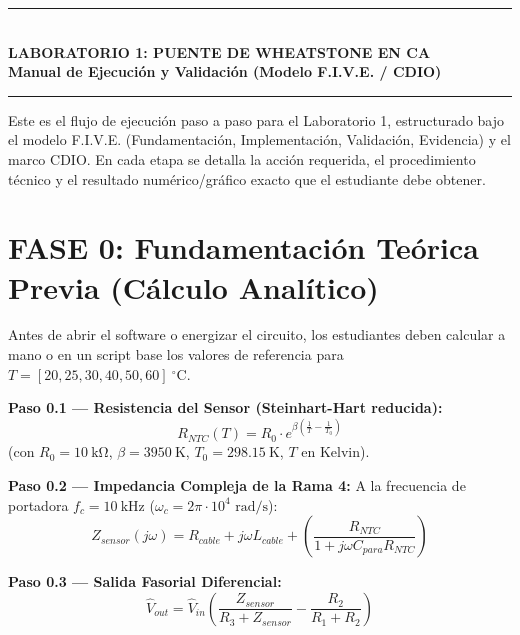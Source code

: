 \documentclass[11pt,a4paper]{article}
\begin{document}
\begin{center}
    \rule{\textwidth}{1pt}\\[0.3cm]
    {\Large \textbf{LABORATORIO 1: PUENTE DE WHEATSTONE EN CA}}\\[0.2cm]
    {\large \textbf{Manual de Ejecución y Validación (Modelo F.I.V.E. / CDIO)}}\\[0.2cm]
    \rule{\textwidth}{1pt}
\end{center}
\vspace{0.3cm}

Este es el flujo de ejecución paso a paso para el Laboratorio 1, estructurado bajo el modelo F.I.V.E. (Fundamentación, Implementación, Validación, Evidencia) y el marco CDIO. En cada etapa se detalla la acción requerida, el procedimiento técnico y el resultado numérico/gráfico exacto que el estudiante debe obtener.

\section*{FASE 0: Fundamentación Teórica Previa (Cálculo Analítico)}
Antes de abrir el software o energizar el circuito, los estudiantes deben calcular a mano o en un script base los valores de referencia para $T = [20, 25, 30, 40, 50, 60]\ ^\circ\text{C}$.

\textbf{Paso 0.1 — Resistencia del Sensor (Steinhart-Hart reducida):}
\begin{equation}
    R_{NTC}(T) = R_0 \cdot e^{\beta \left( \frac{1}{T} - \frac{1}{T_0} \right)}
\end{equation}
(con $R_0 = \qty{10}{\kilo\ohm}$, $\beta = \qty{3950}{\kelvin}$, $T_0 = \qty{298.15}{\kelvin}$, $T$ en Kelvin).

\textbf{Paso 0.2 — Impedancia Compleja de la Rama 4:}
A la frecuencia de portadora $f_c = \qty{10}{\kilo\hertz}$ ($\omega_c = 2\pi \cdot 10^4\text{ rad/s}$):
\begin{equation}
    Z_{sensor}(j\omega) = R_{cable} + j\omega L_{cable} + \left( \frac{R_{NTC}}{1 + j\omega C_{para} R_{NTC}} \right)
\end{equation}

\textbf{Paso 0.3 — Salida Fasorial Diferencial:}
\begin{equation}
    \hat{V}_{out} = \hat{V}_{in} \left( \frac{Z_{sensor}}{R_3 + Z_{sensor}} - \frac{R_2}{R_1 + R_2} \right)
\end{equation}
\end{document}
